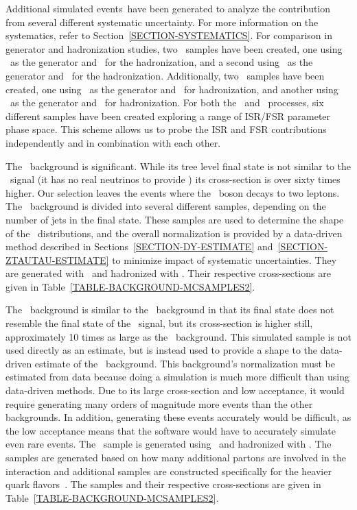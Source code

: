 Additional simulated events\ have been generated to analyze the contribution from several different systematic uncertainty. For more information on the systematics, refer to Section~\ref{SECTION-SYSTEMATICS}. For comparison in generator and hadronization studies, two \Wt\ samples have been created, one using \MCNLO\ as the generator and \HERWIG\ for the hadronization, and a second using \AcerMC\ as the generator and \Pythia\ for the hadronization. Additionally, two \TTbar\ samples have been created, one using \POWHEG\ as the generator and \HERWIG\ for hadronization, and another using \POWHEG\ as the generator and \Pythia\ for hadronization. For both the \TTbar\ and \Wt\ processes, six different samples have been created exploring a range of ISR/FSR parameter phase space. This scheme allows us to probe the ISR and FSR contributions independently and in combination with each other.

The \Zjets\ background is significant. While its tree level final state is not similar to the \Wt\ signal (it has no real neutrinos to provide \MET) its cross-section is over sixty times higher. Our selection leaves the events where the \Zboson\ boson decays to two leptons. The \Zjets\ background is divided into several different samples, depending on the number of jets in the final state. These samples are used to determine the shape of the \Zjets\ distributions, and the overall normalization is provided by a data-driven method described in Sections~\ref{SECTION-DY-ESTIMATE} and~\ref{SECTION-ZTAUTAU-ESTIMATE} to minimize impact of systematic uncertainties. They are generated with \ALPGEN\ and hadronized with \HERWIG. Their respective cross-sections are given in Table~\ref{TABLE-BACKGROUND-MCSAMPLES2}.

The \Wjets\ background is similar to the \Zjets\ background in that its final state does not resemble the final state of the \Wt\ signal, but its cross-section is higher still, approximately 10 times as large as the \Zjets\ background. This simulated sample is not used directly as an estimate, but is instead used to provide a shape to the data-driven estimate of the \multijet\ background. This background's normalization must be estimated from data because doing a simulation is much more difficult than using data-driven methods. Due to its large cross-section and low acceptance, it would require generating many orders of magnitude more events than the other backgrounds. In addition, generating these events accurately would be difficult, as the low acceptance means that the software would have to accurately simulate even rare events. The \Wjets\ sample is generated using \ALPGEN\ and hadronized with \HERWIG. The samples are generated based on how many additional partons are involved in the interaction and additional samples are constructed specifically for the heavier quark flavors~\cite{LEPJETINTNOTE}. The samples and their respective cross-sections are given in Table~\ref{TABLE-BACKGROUND-MCSAMPLES2}.

